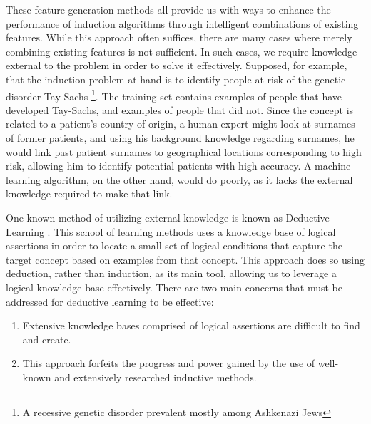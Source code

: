 \documentclass[twoside,11pt]{article}
\theoremstyle{definition}
\begin{document}
These feature generation methods all provide us with ways to enhance the performance of induction algorithms through intelligent combinations of existing features. While this approach often suffices, there are many cases where merely combining existing features is not sufficient. 
In such cases, we require knowledge external to the problem in order to solve it effectively.
Supposed, for example, that the induction problem at hand is to identify people at risk of the genetic disorder Tay-Sachs \footnote{A recessive genetic disorder prevalent mostly among Ashkenazi Jews}. The training set contains examples of people that have developed Tay-Sachs, and examples of people that did not. Since the concept is related to a patient's country of origin, a human expert might look at surnames of former patients, and using his background knowledge regarding surnames, he would link past patient surnames to geographical locations corresponding to high risk, allowing him to identify potential patients with high accuracy.
A machine learning algorithm, on the other hand, would do poorly, as it lacks the external knowledge required to make that link.


One known method of utilizing external knowledge is known as Deductive Learning \cite{mitchell1982generalization,dejong1986explanation}. This school of learning methods uses a knowledge base of logical assertions in order to locate a small set of logical conditions that capture the target concept based on examples from that concept. This approach does so using deduction, rather than induction, as its main tool, allowing us to leverage a logical knowledge base effectively.
There are two main concerns that must be addressed for deductive learning to be effective:
\begin{enumerate}
	\item Extensive knowledge bases comprised of logical assertions are difficult to find and create.
	\item This approach forfeits the progress and power gained by the use of well-known and extensively researched inductive methods.
\end{enumerate}
\end{document}
